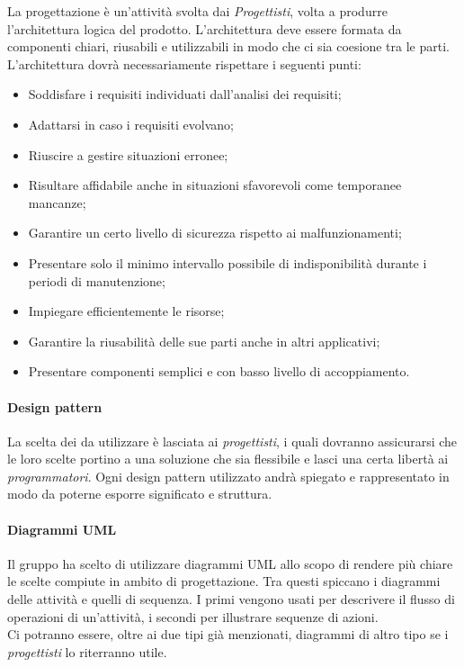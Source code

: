 La progettazione è un'attività svolta dai \emph{Progettisti}, volta a produrre l'architettura logica del prodotto.
L'architettura deve essere formata da componenti chiari, riusabili e utilizzabili in modo che ci sia coesione tra
le parti.\\
L'architettura dovrà necessariamente rispettare i seguenti punti:
\begin{itemize}
    \item Soddisfare i requisiti individuati dall'analisi dei requisiti;
    \item Adattarsi in caso i requisiti evolvano;
    \item Riuscire a gestire situazioni erronee;
    \item Risultare affidabile anche in situazioni sfavorevoli come temporanee mancanze;
    \item Garantire un certo livello di sicurezza rispetto ai malfunzionamenti;
    \item Presentare solo il minimo intervallo possibile di indisponibilità durante i periodi di manutenzione;
    \item Impiegare efficientemente le risorse;
    \item Garantire la riusabilità delle sue parti anche in altri applicativi;
    \item Presentare componenti semplici e con basso livello di accoppiamento.
\end{itemize}

\paragraph{Design pattern}

La scelta dei  da utilizzare è lasciata ai \emph{progettisti}, i quali dovranno
assicurarsi che le loro scelte portino a una soluzione che sia flessibile e lasci una certa libertà ai
\emph{programmatori}. Ogni design pattern utilizzato andrà spiegato e rappresentato in modo da poterne esporre
significato e struttura.

\paragraph{Diagrammi UML}

Il gruppo ha scelto di utilizzare diagrammi UML allo scopo di rendere più chiare le scelte compiute in ambito di
progettazione. Tra questi spiccano i diagrammi delle attività e quelli di sequenza. I primi vengono
usati per descrivere il flusso di operazioni di un'attività, i secondi per illustrare sequenze di azioni.\\
Ci potranno essere, oltre ai due tipi già menzionati, diagrammi di altro tipo se i \emph{progettisti} lo riterranno
utile.

